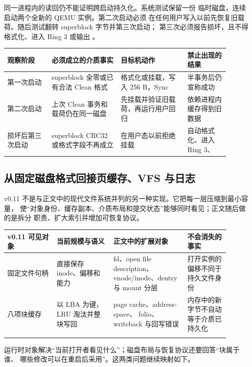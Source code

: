 同一进程内的读回仍不能证明跨启动持久化。系统测试保留一份
 临时磁盘，连续启动两个全新的 QEMU 实例。第二次启动必须
在任何用户写入以前先恢复旧载荷。随后测试翻转 superblock 字节并第三次启动；
第三次必须报告损坏，且不得格式化、进入 Ring 3 或输出 。

\begin{longtable}{|L{0.18\linewidth}|L{0.28\linewidth}|L{0.27\linewidth}|L{0.17\linewidth}|}
\toprule
观察阶段 & 必须成立的介质事实 & 目标机动作 & 禁止出现的结果 \\
\midrule
第一次启动 & superblock 全零或已有合法 Clean 格式 & 格式化或挂载，写入 256 B，Sync & 半事务后仍宣称成功 \\\tablerowrule
第二次启动 & 上次 Clean 事务和载荷仍在同一磁盘 & 先挂载并验证旧载荷，再运行用户回归 & 依赖进程内缓存得到旧数据 \\\tablerowrule
损坏后第三次启动 & superblock CRC32 或格式字段不再成立 & 在用户态以前拒绝挂载 & 自动格式化、进入 Ring 3、 \\
\bottomrule
\end{longtable}

\subsection{从固定磁盘格式回接页缓存、VFS 与日志}

v0.11 不是与正文中的现代文件系统并列的另一种实现。它把每一层压缩到最小容量，
使“对象身份、缓存副本、介质布局和提交状态”能够同时看见；正文随后做的是拆分
职责、扩大索引并增加可恢复协议。

\begin{longtable}{|L{0.20\linewidth}|L{0.23\linewidth}|L{0.30\linewidth}|L{0.17\linewidth}|}
\toprule
v0.11 可见对象 & 当前规模与语义 & 正文中的扩展对象 & 不会消失的事实 \\
\midrule
\endhead
固定文件句柄 & 直接保存 inode、偏移和能力 & fd、open file description、
vnode/inode、dentry 与 mount 分层 & 打开实例的偏移不同于持久文件身份
\\\tablerowrule
八项块缓存 & 以 LBA 为键，LRU 淘汰并整块写回 & page cache、address-space、
folio、writeback 与回写错误 & 内存中的新字节不自动等于介质已持久化 \\\tablerowrule
\bottomrule
\end{longtable}

运行时对象解决“当前打开者看见什么”；磁盘布局与恢复协议还要回答“块属于谁、
哪些修改可以在重启后采用”。这两类问题继续映射如下。

